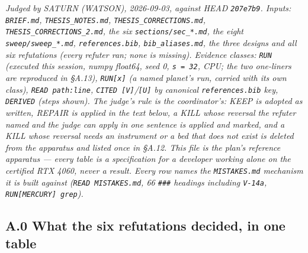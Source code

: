 \documentclass[11pt,a4paper]{article}
\newcounter{none}                 %
\theoremstyle{plain}
\theoremstyle{definition}
\theoremstyle{remark}
\begin{document}
\emph{Judged by SATURN (WATSON), 2026-09-03, against HEAD
\texttt{207e7b9}. Inputs: \texttt{BRIEF.md}, \texttt{THESIS\_NOTES.md},
\texttt{THESIS\_CORRECTIONS.md}, \texttt{THESIS\_CORRECTIONS\_2.md}, the
six \texttt{sections/sec\_*.md}, the eight \texttt{sweep/sweep\_*.md},
\texttt{references.bib}, \texttt{bib\_aliases.md}, the three designs and
all six refutations (every refuter ran; none is missing). Evidence
classes: \texttt{RUN} (executed this session, numpy float64, seed 0,
\texttt{s\ =\ 32}, CPU; the two one-liners are reproduced in §A.13),
\texttt{RUN{[}x{]}} (a named planet's run, carried with its own class),
\texttt{READ\ path:line}, \texttt{CITED\ {[}V{]}}/\texttt{{[}U{]}} by
canonical \texttt{references.bib} key, \texttt{DERIVED} (steps shown).
The judge's rule is the coordinator's: KEEP is adopted as written,
REPAIR is applied in the text below, a KILL whose reversal the refuter
named and the judge can apply in one sentence is applied and marked, and
a KILL whose reversal needs an instrument or a bed that does not exist
is deleted from the apparatus and listed once in §A.12. This file is the
plan's reference apparatus --- every table is a specification for a
developer working alone on the certified RTX 4060, never a result. Every
row names the \texttt{MISTAKES.md} mechanism it is built against
(\texttt{READ\ MISTAKES.md}, 66 \texttt{\#\#\#} headings including
\texttt{V-14a}, \texttt{RUN{[}MERCURY{]}\ grep}).}

\subsection{A.0 What the six refutations decided, in one
table}\label{a.0-what-the-six-refutations-decided-in-one-table}
\end{document}
